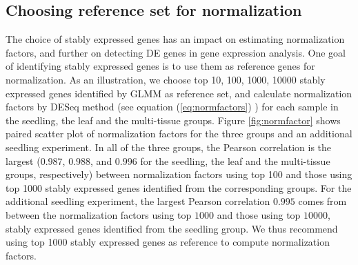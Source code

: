 \documentclass[11pt, a4paper]{article}
\begin{document}
\subsection{Choosing reference set for normalization}\label{Section:commonReference}
The choice of stably expressed genes has an impact on estimating normalization factors, and further on detecting DE genes in gene expression analysis. 
One goal of identifying stably expressed genes is to use them as reference genes for normalization. As an illustration, we choose top 10, 100, 1000, 10000 stably expressed genes identified by GLMM as reference set, and calculate normalization factors by DESeq method (see equation (\ref{eq:normfactors}) ) for each sample in the seedling, the leaf and the multi-tissue groups. Figure \ref{fig:normfactor} shows paired scatter plot of normalization factors for the three groups and an additional seedling experiment. In all of the three groups, the Pearson correlation is the largest ($0.987$, $0.988$, and $0.996$ for the seedling, the leaf and the multi-tissue groups, respectively) between normalization factors using top 100 and those using top 1000 stably expressed genes identified from the corresponding groups. For the additional seedling experiment, the largest Pearson correlation $0.995$ comes from between the normalization factors using top $1000$ and those using top $10000$, stably expressed genes identified from the seedling group. We thus recommend using top 1000 stably expressed genes as reference to compute normalization factors. %
\end{document}
